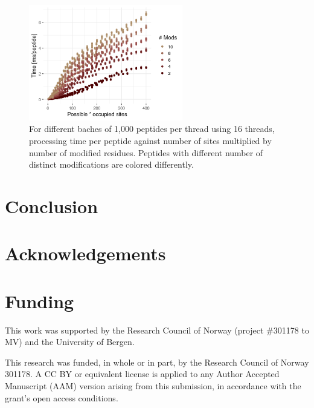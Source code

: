 \documentclass[]{article}
\begin{document}
\begin{figure}[!tpb]
\centerline{\includegraphics[width=0.6\textwidth]{figures/benchmark_29.12.22_size.png}}
\caption{For different baches of 1,000 peptides per thread using 16 threads, processing time per peptide against number of sites multiplied by number of modified residues. Peptides with different number of distinct modifications are colored differently.}\label{fig:performance_size}
\end{figure}


\section{Conclusion}


\section*{Acknowledgements}


\section*{Funding}

This work was supported by the Research Council of Norway (project \#301178 to MV) and the University of Bergen.

This research was funded, in whole or in part, by the Research Council of Norway 301178. A CC BY or equivalent license is applied to any Author Accepted Manuscript (AAM) version arising from this submission, in accordance with the grant’s open access conditions.





\end{document}
